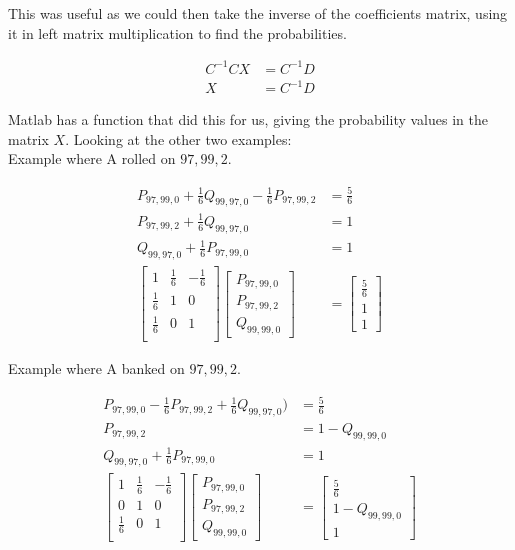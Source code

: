 \documentclass[a4paper,titlepage]{article}
\begin{document}
This was useful as we could then take the inverse of the coefficients matrix, using it in left matrix multiplication to find the probabilities.

\begin{align*}
	C^{-1}CX &= C^{-1}D\\
	X        &= C^{-1}D
\end{align*}

Matlab has a function that did this for us, giving the probability values in the matrix $X$. Looking at the other two examples:\\
Example where A rolled on $97,99,2$.

\begin{align*}
	P_{97,99,0} + \frac{1}{6}Q_{99,97,0} - \frac{1}{6}P_{97,99,2} &= \frac{5}{6}\\
	P_{97,99,2} + \frac{1}{6}Q_{99,97,0}                          &=  1\\
	Q_{99,97,0} + \frac{1}{6}P_{97,99,0}                          &= 1\\
	\begin{bmatrix}
		1           & \frac{1}{6} & -\frac{1}{6}\\
		\frac{1}{6} & 1           & 0\\
		\frac{1}{6} & 0           & 1\\
	\end{bmatrix}
	\begin{bmatrix}
		P_{97,99,0}\\
		P_{97,99,2}\\
		Q_{99,99,0}
	\end{bmatrix}
	& =
	\begin{bmatrix}
		\frac{5}{6}\\
		1\\
		1
	\end{bmatrix}
\end{align*}

Example where A banked on $97,99,2$.

\begin{align*}
	P_{97,99,0} - \frac{1}{6}P_{97,99,2} + \frac{1}{6}Q_{99,97,0}) &= \frac{5}{6}\\
	P_{97,99,2}                                                    &= 1 - Q_{99,99,0}\\
	Q_{99,97,0} + \frac{1}{6}P_{97,99,0}                           &= 1\\
	\begin{bmatrix}
		1           & \frac{1}{6} & -\frac{1}{6}\\
		0           & 1           & 0\\
		\frac{1}{6} & 0           & 1\\
	\end{bmatrix}
	\begin{bmatrix}
		P_{97,99,0}\\
		P_{97,99,2}\\
		Q_{99,99,0}
	\end{bmatrix}
	& =
	\begin{bmatrix}
		\frac{5}{6}\\
		1 - Q_{99,99,0}\\
		1
	\end{bmatrix}
\end{align*}
\end{document}
